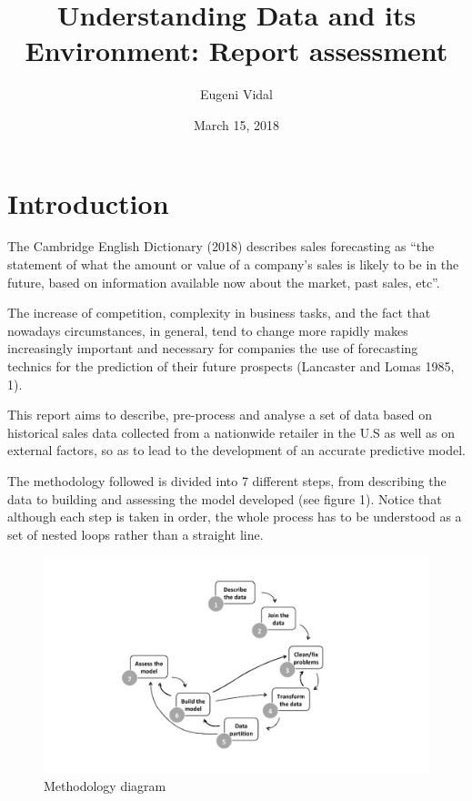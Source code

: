 \documentclass[11pt,]{article}
\title{Understanding Data and its Environment: Report assessment}
\author{Eugeni Vidal}
\date{March 15, 2018}
\begin{document}
\maketitle

{
\setcounter{tocdepth}{2}
\tableofcontents
}
\pagebreak

\section{Introduction}\label{introduction}

The Cambridge English Dictionary (2018) describes sales forecasting as
``the statement of what the amount or value of a company's sales is
likely to be in the future, based on information available now about the
market, past sales, etc''.

The increase of competition, complexity in business tasks, and the fact
that nowadays circumstances, in general, tend to change more rapidly
makes increasingly important and necessary for companies the use of
forecasting technics for the prediction of their future prospects
(Lancaster and Lomas 1985, 1).

 This report aims to describe, pre-process and analyse a set of data
based on historical sales data collected from a nationwide retailer in
the U.S as well as on external factors, so as to lead to the development
of an accurate predictive model.

 The methodology followed is divided into 7 different steps, from
describing the data to building and assessing the model developed (see
figure 1). Notice that although each step is taken in order, the whole
process has to be understood as a set of nested loops rather than a
straight line.

\begin{figure}[htbp]
\centering
\includegraphics{images/Methodology diagram.v1.jpg}
\caption{Methodology diagram \label{}}
\end{figure}
\end{document}
